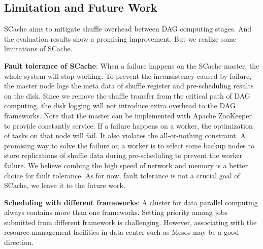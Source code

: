 \subsection{Limitation and Future Work}
SCache aims to mitigate shuffle overhead between DAG computing stages. And the evaluation results show a promising improvement. But we realize some limitations of SCache.

\textbf{Fault tolerance of SCache}: When a failure happens on the SCache master, the whole system will stop working. To prevent the inconsistency caused by failure, the master node logs the meta data of shuffle register and pre-scheduling results on the disk. Since we remove the shuffle transfer from the critical path of DAG computing, the disk logging will not introduce extra overhead to the DAG frameworks. Note that the master can be implemented with Apache ZooKeeper \cite{zookeeper} to provide constantly service. If a failure happens on a worker, the optimization of tasks on that node will fail. It also violates the all-or-nothing constraint. A promising way to solve the failure on a worker is to select some backup nodes to store replications of shuffle data during pre-scheduling to prevent the worker failure. We believe combing the high speed of network and memory is a better choice for fault tolerance. As for now, fault tolerance is not a crucial goal of SCache,  we leave it to the future work.

\textbf{Scheduling with different frameworks}: A cluster for data parallel computing always contains more than one frameworks. Setting priority among jobs submitted from different framework is challenging. However, associating with the resource management facilities in data center such as Mesos \cite{mesos} may be a good direction. 
